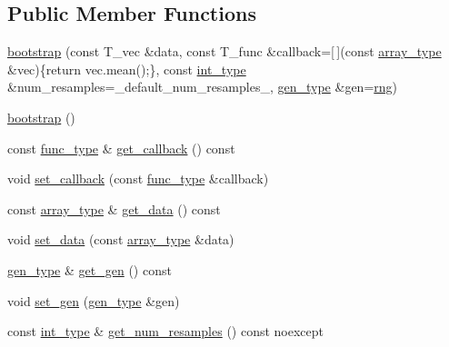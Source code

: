 \subsection*{Public Member Functions}
\begin{DoxyCompactItemize}
\item 
\hyperlink{classIceBRG_1_1bootstrap_a4e5d75942f9e2387a4a767314ce684b4}{bootstrap} (const T\+\_\+vec \&data, const T\+\_\+func \&callback=\mbox{[}$\,$\mbox{]}(const \hyperlink{classIceBRG_1_1bootstrap_ad055f31f4e3e35b1cb99ea2f846f2f91}{array\+\_\+type} \&vec)\{return vec.\+mean();\}, const \hyperlink{lib_2IceBRG__main_2common_8h_ac4de9d9335536ac22821171deec8d39e}{int\+\_\+type} \&num\+\_\+resamples=\+\_\+default\+\_\+num\+\_\+resamples\+\_\+, \hyperlink{classIceBRG_1_1bootstrap_a020ba191b3581f1896c0f4b968f7c5b6}{gen\+\_\+type} \&gen=\hyperlink{namespaceIceBRG_a43349d2fe56e49b46f2da45c2472137d}{rng})
\item 
\hyperlink{classIceBRG_1_1bootstrap_a9daa28326739a0874d53ad146cc6f5b2}{bootstrap} ()
\item 
const \hyperlink{classIceBRG_1_1bootstrap_a4031940b86921fbeb3db1d05a823c7e7}{func\+\_\+type} \& \hyperlink{classIceBRG_1_1bootstrap_adce1acf32ab05d025eafb64b51796cec}{get\+\_\+callback} () const 
\item 
void \hyperlink{classIceBRG_1_1bootstrap_a9fd244b68f983b537704ec5e470cf356}{set\+\_\+callback} (const \hyperlink{classIceBRG_1_1bootstrap_a4031940b86921fbeb3db1d05a823c7e7}{func\+\_\+type} \&callback)
\item 
const \hyperlink{classIceBRG_1_1bootstrap_ad055f31f4e3e35b1cb99ea2f846f2f91}{array\+\_\+type} \& \hyperlink{classIceBRG_1_1bootstrap_aead38346ac8b76ef969beddd03ec02d4}{get\+\_\+data} () const 
\item 
void \hyperlink{classIceBRG_1_1bootstrap_ad508062011d50b90b0111fc898036a00}{set\+\_\+data} (const \hyperlink{classIceBRG_1_1bootstrap_ad055f31f4e3e35b1cb99ea2f846f2f91}{array\+\_\+type} \&data)
\item 
\hyperlink{classIceBRG_1_1bootstrap_a020ba191b3581f1896c0f4b968f7c5b6}{gen\+\_\+type} \& \hyperlink{classIceBRG_1_1bootstrap_a3dfbbadb5553f020cfe0cd03e682a799}{get\+\_\+gen} () const 
\item 
void \hyperlink{classIceBRG_1_1bootstrap_a289afcca28870c8871576f78483de140}{set\+\_\+gen} (\hyperlink{classIceBRG_1_1bootstrap_a020ba191b3581f1896c0f4b968f7c5b6}{gen\+\_\+type} \&gen)
\item 
const \hyperlink{lib_2IceBRG__main_2common_8h_ac4de9d9335536ac22821171deec8d39e}{int\+\_\+type} \& \hyperlink{classIceBRG_1_1bootstrap_a5e6f851ead11399fe933121a41a537bd}{get\+\_\+num\+\_\+resamples} () const  noexcept

\end{DoxyCompactItemize}
